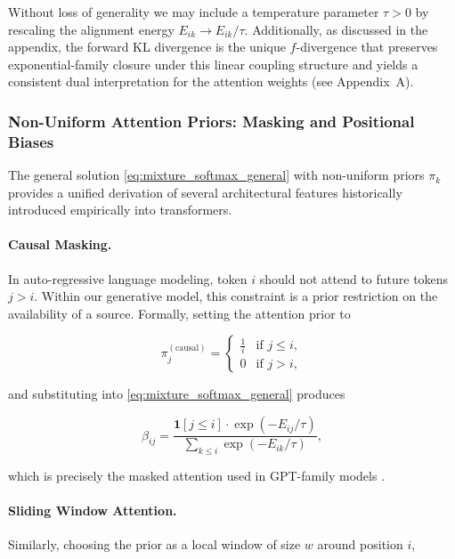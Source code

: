 \documentclass[twoside,11pt]{article}
\begin{document}
Without loss of generality we may include a temperature parameter $\tau > 0$ by rescaling the alignment energy $E_{ik} \to E_{ik}/\tau$. Additionally, as discussed in the appendix, the forward KL divergence is the unique $f$-divergence that preserves exponential-family closure under this linear coupling structure and yields a consistent dual interpretation for the attention weights (see Appendix~A).

\subsubsection{Non-Uniform Attention Priors: Masking and Positional Biases}
\label{sec:nonuniform_priors}

The general solution \eqref{eq:mixture_softmax_general} with non-uniform priors $\pi_k$ provides a unified derivation of several architectural features historically introduced empirically into transformers. 

\paragraph{Causal Masking.}
In auto-regressive language modeling, token $i$ should not attend to future tokens $j > i$. Within our generative model, this constraint is a prior restriction on the availability of a source. Formally, setting the attention prior to

\begin{equation}
\pi_j^{(\text{causal})} = \begin{cases} \frac{1}{i} & \text{if } j \leq i, \\ 0 & \text{if } j > i, \end{cases}
\label{eq:causal_prior}
\end{equation}

and substituting into \eqref{eq:mixture_softmax_general} produces

\begin{equation}
\beta_{ij} = \frac{\mathbf{1}[j \leq i] \cdot \exp(-E_{ij}/\tau)}{\sum_{k \leq i} \exp(-E_{ik}/\tau)},
\label{eq:causal_attention}
\end{equation}

which is precisely the masked attention used in GPT-family models \citep{radford2019language}. 

\paragraph{Sliding Window Attention.}
Similarly, choosing the prior as a local window of size $w$ around position $i$,
\end{document}

